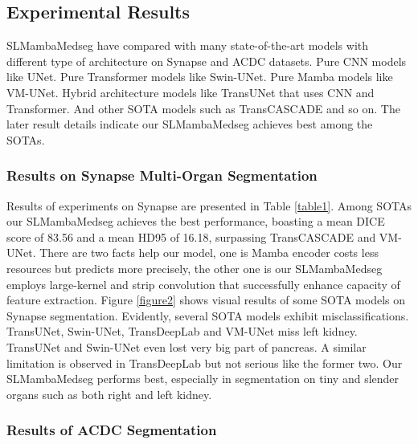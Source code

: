 \documentclass[letterpaper, 10 pt, conference]{ieeeconf}  %
\begin{document}
\subsection{Experimental Results}

SLMambaMedseg have compared with many state-of-the-art models with different type of architecture on Synapse and ACDC datasets. Pure CNN models like UNet\cite{ronneberger2015unet}. Pure Transformer models like Swin-UNet\cite{cao2021swinunet,cao2021swinunet}. Pure Mamba models like VM-UNet\cite{ruan2024vmunet}. Hybrid architecture models like TransUNet\cite{chen2021transunet} that uses CNN and Transformer. And other SOTA models such as TransCASCADE\cite{rahman2023transcascade} and so on. The later result details indicate our SLMambaMedseg achieves best among the SOTAs.



\subsubsection{Results on Synapse Multi-Organ Segmentation}

Results of experiments on Synapse are presented in Table \textcolor{red}{\ref{table1}}. Among SOTAs our SLMambaMedseg achieves the best performance, boasting a mean DICE score of 83.56 and a mean HD95 of 16.18, surpassing TransCASCADE\cite{rahman2023transcascade} and VM-UNet\cite{ruan2024vmunet}. There are two facts help our model, one is Mamba encoder costs less resources but predicts more precisely, the other one is our SLMambaMedseg employs large-kernel and strip convolution that successfully enhance capacity of feature extraction. Figure \textcolor{red}{\ref{figure2}} shows visual results of some SOTA models on Synapse segmentation. Evidently, several SOTA models exhibit misclassifications. TransUNet\cite{chen2021transunet}, Swin-UNet\cite{cao2021swinunet}, TransDeepLab\cite{azad2022transdeeplab} and VM-UNet\cite{ruan2024vmunet} miss left kidney. TransUNet\cite{chen2021transunet} and Swin-UNet\cite{cao2021swinunet} even lost very big part of pancreas. A similar limitation is observed in TransDeepLab\cite{azad2022transdeeplab} but not serious like the former two. Our SLMambaMedseg performs best, especially in segmentation on tiny and slender organs such as both right and left kidney.




\subsubsection{Results of ACDC Segmentation}
\end{document}
